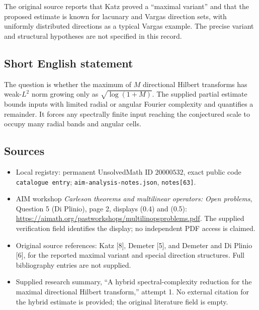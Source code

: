 \documentclass[11pt]{article}
\begin{document}
The original source reports that Katz proved a ``maximal variant'' and that the proposed estimate is known for lacunary and Vargas direction sets, with uniformly distributed directions as a typical Vargas example. The precise variant and structural hypotheses are not specified in this record.
\subsection{Short English statement}
The question is whether the maximum of \(M\) directional Hilbert transforms has weak-\(L^2\) norm growing only as \(\sqrt{\log(1+M)}\). The supplied partial estimate bounds inputs with limited radial or angular Fourier complexity and quantifies a remainder. It forces any spectrally finite input reaching the conjectured scale to occupy many radial bands and angular cells.
\subsection{Sources}
\begin{itemize}
\item Local registry: permanent UnsolvedMath ID \(20000532\), exact public code \texttt{catalogue entry}; \texttt{aim-analysis-notes.json}, \texttt{notes[63]}.
\item AIM workshop \emph{Carleson theorems and multilinear operators: Open problems}, Question 5 (Di Plinio), page 2, displays (0.4) and (0.5): \url{https://aimath.org/pastworkshops/multilinopsproblems.pdf}. The supplied verification field identifies the display; no independent PDF access is claimed.
\item Original source references: Katz [8], Demeter [5], and Demeter and Di Plinio [6], for the reported maximal variant and special direction structures. Full bibliography entries are not supplied.
\item Supplied research summary, ``A hybrid spectral-complexity reduction for the maximal directional Hilbert transform,'' attempt 1. No external citation for the hybrid estimate is provided; the original literature field is empty.
\end{itemize}
\end{document}

